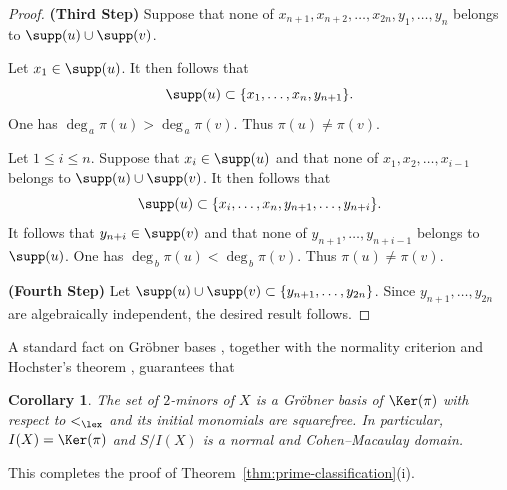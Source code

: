 \documentclass[12pt]{amsart}
\numberwithin{equation}{section}
\newtheorem{Corollary}[Theorem]{Corollary}
\begin{document}
\begin{proof}
\medskip

\noindent
{\bf (Third Step)}  Suppose that none of $x_{n+1}, x_{n+2}, \ldots, x_{2n}, y_1, \ldots, y_n$ belongs to $\supp(u) \cup \supp(v)$.  

Let $x_1 \in \supp(u)$.  It then follows that  
\[
\supp(u) \subset \{x_1, \ldots, x_n, y_{n+1}\}.
\] 
One has $\deg_{\,a}{\pi(u)} > \deg_{\,a}{\pi(v)}$.  Thus $\pi(u) \neq \pi(v)$.

Let $1 \leq i \leq n$.  Suppose that $x_i \in \supp(u)$ and that none of $x_1, x_2, \ldots, x_{i-1}$ belongs to $\supp(u) \cup \supp(v)$.  It then follows that  
\[
\supp(u) \subset \{x_i, \ldots, x_n, y_{n+1}, \ldots, y_{n+i}\}.
\]
It follows that $y_{n+i} \in \supp(v)$ and that none of $y_{n+1}, \ldots, y_{n+i-1}$ belongs to $\supp(u)$.  
One has $\deg_{\,b}{\pi(u)} < \deg_{\,b}{\pi(v)}$.  Thus $\pi(u) \neq \pi(v)$.

\medskip

\noindent
{\bf (Fourth Step)}  Let $\supp(u) \cup \supp(v) \subset \{y_{n+1}, \ldots, y_{2n}\}$.  Since $y_{n+1}, \ldots, y_{2n}$ are algebraically independent, the desired result follows. 
\hspace{9.1cm}
\end{proof}

A standard fact on Gr\"obner bases
\cite[Proposition~2.2.5]{HHgtm260},
together with the normality criterion
\cite[Proposition~13.15]{Stu}
and Hochster's theorem
\cite[Theorem~1]{Hochster1972},
guarantees that


\begin{Corollary}
    The set of $2$-minors of $X$ is a Gr\"obner basis of $\Ker(\pi)$ with respect to $<_{\lex}$ and its initial monomials are
squarefree. In particular, $I(X)=\Ker(\pi)$
and $S/I(X)$ is a normal and Cohen--Macaulay domain.
\end{Corollary}

This completes the proof of Theorem~\ref{thm:prime-classification}(i).

\end{document}
